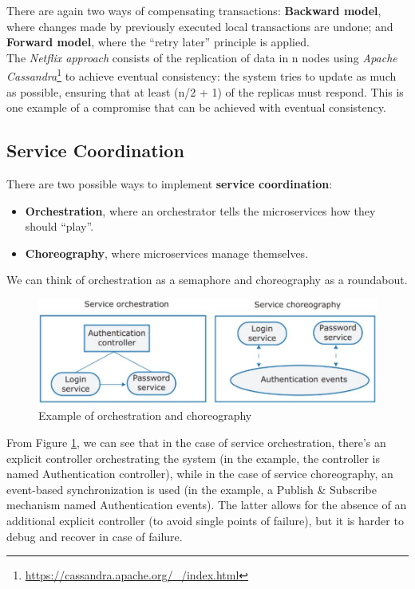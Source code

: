 There are again two ways of compensating transactions: \newline\textbf{Backward model}, where changes made by previously executed local transactions are undone; and \textbf{Forward model}, where the “retry later” principle is applied. \\

The \textit{Netflix approach} consists of the replication of data in n nodes using \textit{Apache Cassandra}\footnote{\url{https://cassandra.apache.org/_/index.html}} to achieve eventual consistency: the system tries to update as much as possible, ensuring that at least (n/2 + 1) of the replicas must respond. This is one example of a compromise that can be achieved with eventual consistency.

\subsection{Service Coordination}

There are two possible ways to implement \textbf{service coordination}: 
\begin{itemize}
    \item \textbf{Orchestration}, where an orchestrator tells the microservices how they should “play”.
    \item \textbf{Choreography}, where microservices manage themselves.
\end{itemize}
We can think of orchestration as a semaphore and choreography as a roundabout.

\begin{figure} [H]
    \centering
    \includegraphics[width=1\textwidth]{images/Microservices/orchestration-vs-choreography.PNG}
    \caption{Example of orchestration and choreography}
    \label{fig:orchestration-vs-choreography}
\end{figure} 

From Figure \ref{fig:orchestration-vs-choreography}, we can see that in the case of service orchestration, there's an explicit controller orchestrating the system (in the example, the controller is named Authentication controller), while in the case of service choreography, an event-based synchronization is used (in the example, a Publish \& Subscribe mechanism named Authentication events). The latter allows for the absence of an additional explicit controller (to avoid single points of failure), but it is harder to debug and recover in case of failure. \\

